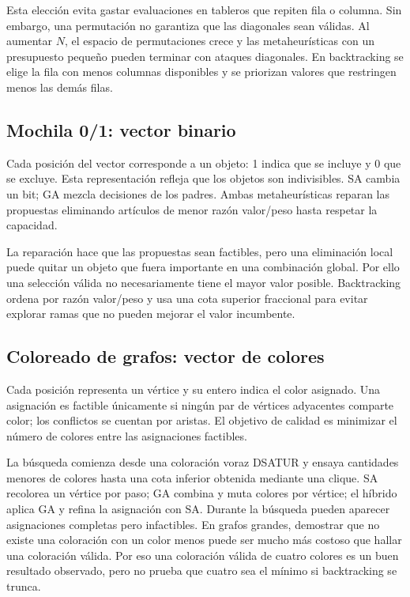 \documentclass[12pt,letterpaper]{article}
\begin{document}
Esta elección evita gastar evaluaciones en tableros que repiten fila o columna.
Sin embargo, una permutación no garantiza que las diagonales sean válidas. Al
aumentar $N$, el espacio de permutaciones crece y las metaheurísticas con un
presupuesto pequeño pueden terminar con ataques diagonales. En backtracking se
elige la fila con menos columnas disponibles y se priorizan valores que
restringen menos las demás filas.

\subsection{Mochila 0/1: vector binario}

Cada posición del vector corresponde a un objeto: 1 indica que se incluye y 0
que se excluye. Esta representación refleja que los objetos son indivisibles.
SA cambia un bit; GA mezcla decisiones de los padres. Ambas metaheurísticas
reparan las propuestas eliminando artículos de menor razón valor/peso hasta
respetar la capacidad.

La reparación hace que las propuestas sean factibles, pero una eliminación
local puede quitar un objeto que fuera importante en una combinación global.
Por ello una selección válida no necesariamente tiene el mayor valor posible.
Backtracking ordena por razón valor/peso y usa una cota superior fraccional
para evitar explorar ramas que no pueden mejorar el valor incumbente.

\subsection{Coloreado de grafos: vector de colores}

Cada posición representa un vértice y su entero indica el color asignado. Una
asignación es factible únicamente si ningún par de vértices adyacentes comparte
color; los conflictos se cuentan por aristas. El objetivo de calidad es
minimizar el número de colores entre las asignaciones factibles.

La búsqueda comienza desde una coloración voraz DSATUR y ensaya cantidades
menores de colores hasta una cota inferior obtenida mediante una clique. SA
recolorea un vértice por paso; GA combina y muta colores por vértice; el híbrido
aplica GA y refina la asignación con SA. Durante la búsqueda pueden aparecer
asignaciones completas pero infactibles. En grafos grandes, demostrar que no
existe una coloración con un color menos puede ser mucho más costoso que hallar
una coloración válida. Por eso una coloración válida de cuatro colores es un
buen resultado observado, pero no prueba que cuatro sea el mínimo si
backtracking se trunca.
\end{document}
